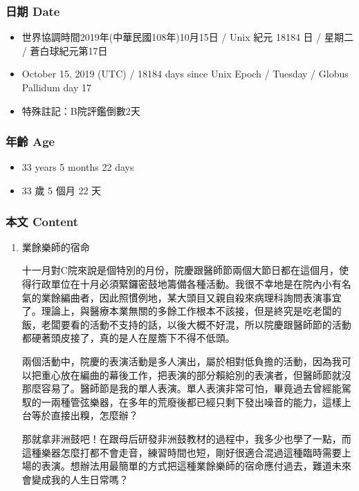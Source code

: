 \documentclass[
]{article}
\providecommand{\tightlist}{%
  \setlength{\itemsep}{0pt}\setlength{\parskip}{0pt}}
\begin{document}
\hypertarget{ux65e5ux671f-date-16}{%
\subsubsection{日期 Date}\label{ux65e5ux671f-date-16}}

\begin{itemize}
\tightlist
\item
  世界協調時間2019年(中華民國108年)10月15日 / Unix 紀元 18184 日 /
  星期二 / 蒼白球紀元第17日
\item
  October 15, 2019 (UTC) / 18184 days since Unix Epoch / Tuesday /
  Globus Pallidum day 17
\item
  特殊註記：B院評鑑倒數2天
\end{itemize}

\hypertarget{ux5e74ux9f61-age-16}{%
\subsubsection{年齡 Age}\label{ux5e74ux9f61-age-16}}

\begin{itemize}
\tightlist
\item
  33 years 5 months 22 days
\item
  33 歲 5 個月 22 天
\end{itemize}

\hypertarget{ux672cux6587-content-16}{%
\subsubsection{本文 Content}\label{ux672cux6587-content-16}}

\begin{enumerate}
\def\labelenumi{\arabic{enumi}.}
\item
  業餘樂師的宿命

  十一月對C院來說是個特別的月份，院慶跟醫師節兩個大節日都在這個月，使得行政單位在十月必須緊鑼密鼓地籌備各種活動。我很不幸地是在院內小有名氣的業餘編曲者，因此照慣例地，某大頭目又親自殺來病理科詢問表演事宜了。理論上，與醫療本業無關的多餘工作根本不該接，但是終究是吃老闆的飯，老闆要看的活動不支持的話，以後大概不好混，所以院慶跟醫師節的活動都硬著頭皮接了，真的是人在屋簷下不得不低頭。

  兩個活動中，院慶的表演活動是多人演出，屬於相對低負擔的活動，因為我可以把重心放在編曲的幕後工作，把表演的部分賴給別的表演者，但醫師節就沒那麼容易了。醫師節是我的單人表演。單人表演非常可怕，畢竟過去曾經能駕馭的一兩種管弦樂器，在多年的荒廢後都已經只剩下發出噪音的能力，這樣上台等於直接出糗，怎麼辦？

  那就拿非洲鼓吧！在跟母后研發非洲鼓教材的過程中，我多少也學了一點，而這種樂器怎麼打都不會走音，練習時間也短，剛好很適合混過這種臨時需要上場的表演。想辦法用最簡單的方式把這種業餘樂師的宿命應付過去，難道未來會變成我的人生日常嗎？
\end{enumerate}
\end{document}

